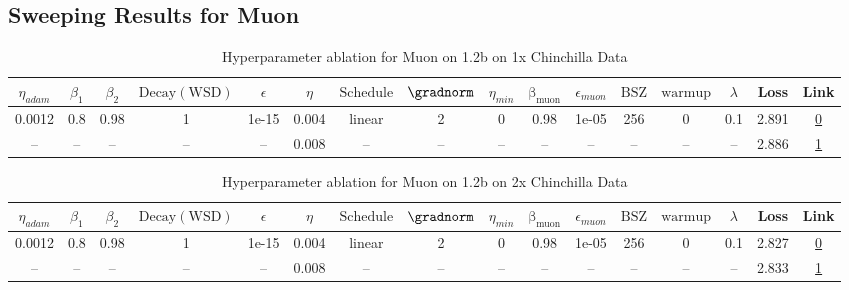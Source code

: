 \subsection{Sweeping Results for Muon}%
\begin{table}[H]
\centering
\caption{Hyperparameter ablation for Muon on 1.2b on 1x Chinchilla Data}
\label{tab:ablation_muon_1.2b_on_1x_chinchilla_data}
\begin{tabular}{cccccccccccccccc}
\toprule
$\eta_{adam}$ & $\beta_1$ & $\beta_2$ & $\mathrm{Decay (WSD)}$ & $\epsilon$ & $\eta$ & $\mathrm{Schedule}$ & $\gradnorm$ & $\eta_{min}$ & $\mathrm{\beta_{muon}}$ & $\epsilon_{muon}$ & $\mathrm{BSZ}$ & $\mathrm{warmup}$ & $\lambda$ & Loss & Link \\
\midrule
0.0012 & 0.8 & 0.98 & 1 & 1e-15 & 0.004 & linear & 2 & 0 & 0.98 & 1e-05 & 256 & 0 & 0.1 & 2.891 & \href{https://wandb.ai/stanford-mercury/optimizer-scaling/runs/sweep-1.2b-24B-muon42df73lr0.004-wd0.1-minlr0.0-warmup0.0-b10.8--70a4b4}{0} \\
\midrule
-- & -- & -- & -- & -- & 0.008 & -- & -- & -- & -- & -- & -- & -- & -- & 2.886 & \href{https://wandb.ai/stanford-mercury/optimizer-scaling/runs/sweep-1.2b-24B-muonw84ef30lr0.008-wd0.1-minlr0.0-warmup0.0-b10.8-5ee5b3}{1} \\
\bottomrule
\end{tabular}
\end{table}

\begin{table}[H]
\centering
\caption{Hyperparameter ablation for Muon on 1.2b on 2x Chinchilla Data}
\label{tab:ablation_muon_1.2b_on_2x_chinchilla_data}
\begin{tabular}{cccccccccccccccc}
\toprule
$\eta_{adam}$ & $\beta_1$ & $\beta_2$ & $\mathrm{Decay (WSD)}$ & $\epsilon$ & $\eta$ & $\mathrm{Schedule}$ & $\gradnorm$ & $\eta_{min}$ & $\mathrm{\beta_{muon}}$ & $\epsilon_{muon}$ & $\mathrm{BSZ}$ & $\mathrm{warmup}$ & $\lambda$ & Loss & Link \\
\midrule
0.0012 & 0.8 & 0.98 & 1 & 1e-15 & 0.004 & linear & 2 & 0 & 0.98 & 1e-05 & 256 & 0 & 0.1 & 2.827 & \href{https://wandb.ai/stanford-mercury/optimizer-scaling/runs/sweep-1.2b-48B-muon09cdeclr0.004-wd0.1-minlr0.0-warmup0.0-b10.8--4f2850}{0} \\
\midrule
-- & -- & -- & -- & -- & 0.008 & -- & -- & -- & -- & -- & -- & -- & -- & 2.833 & \href{https://wandb.ai/stanford-mercury/optimizer-scaling/runs/sweep-1.2b-48B-muonforce3466c6lr0.008-wd0.1-minlr0.0-warmup0.0-b-6cf36e}{1} \\
\bottomrule
\end{tabular}
\end{table}

